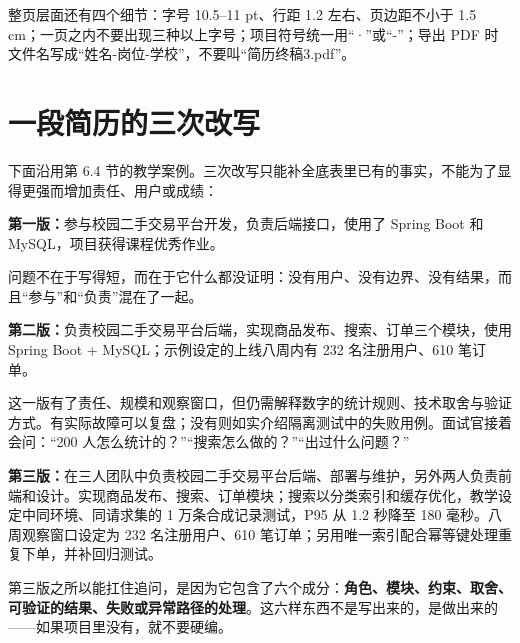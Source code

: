 \documentclass[UTF8,zihao=5,openany]{ctexbook}
\begin{document}
整页层面还有四个细节：字号 10.5--11 pt、行距 1.2 左右、页边距不小于 1.5 cm；一页之内不要出现三种以上字号；项目符号统一用“·”或“-”；导出 PDF 时文件名写成“姓名-岗位-学校”，不要叫“简历终稿3.pdf”。

\section{一段简历的三次改写}
下面沿用第 6.4 节的教学案例。三次改写只能补全底表里已有的事实，不能为了显得更强而增加责任、用户或成绩：

\begin{casebox}
\textbf{第一版：}参与校园二手交易平台开发，负责后端接口，使用了 Spring Boot 和 MySQL，项目获得课程优秀作业。
\end{casebox}

问题不在于写得短，而在于它什么都没证明：没有用户、没有边界、没有结果，而且“参与”和“负责”混在了一起。

\begin{casebox}
\textbf{第二版：}负责校园二手交易平台后端，实现商品发布、搜索、订单三个模块，使用 Spring Boot + MySQL；示例设定的上线八周内有 232 名注册用户、610 笔订单。
\end{casebox}

这一版有了责任、规模和观察窗口，但仍需解释数字的统计规则、技术取舍与验证方式。有实际故障可以复盘；没有则如实介绍隔离测试中的失败用例。面试官接着会问：“200 人怎么统计的？”“搜索怎么做的？”“出过什么问题？”

\begin{casebox}
\textbf{第三版：}在三人团队中负责校园二手交易平台后端、部署与维护，另外两人负责前端和设计。实现商品发布、搜索、订单模块；搜索以分类索引和缓存优化，教学设定中同环境、同请求集的 1 万条合成记录测试，P95 从 1.2 秒降至 180 毫秒。八周观察窗口设定为 232 名注册用户、610 笔订单；另用唯一索引配合幂等键处理重复下单，并补回归测试。
\end{casebox}

第三版之所以能扛住追问，是因为它包含了六个成分：\textbf{角色、模块、约束、取舍、可验证的结果、失败或异常路径的处理}。这六样东西不是写出来的，是做出来的——如果项目里没有，就不要硬编。
\end{document}
